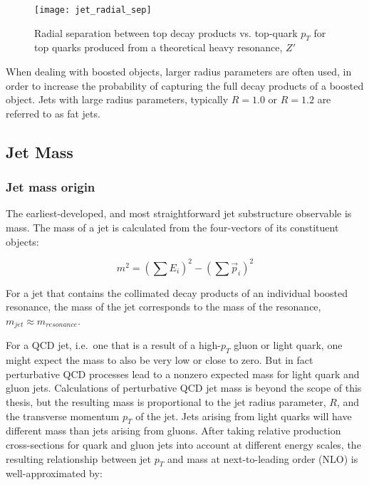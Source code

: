 \begin{figure}[!ht]
    \centering
\texttt{[image: jet\_radial\_sep]}
\caption{Radial separation between top decay products vs. top-quark $p_T$ for top quarks produced from a theoretical heavy resonance, $Z'$}
\label{fig:jet_radial_sep}
\end{figure}

When dealing with boosted objects, larger radius parameters are often used, in order to increase the probability
of capturing the full decay products of a boosted object.
Jets with large radius parameters, typically $R=1.0$ or $R=1.2$ are referred to as fat jets.

\subsection{Jet Mass}\label{subsec:jet_mass}

\subsubsection{Jet mass origin}

The earliest-developed, and most straightforward jet substructure observable is mass.
The mass of a jet is calculated from the four-vectors of its constituent objects:

\begin{equation}\label{eq:jet_mass}
    m^2 = \left(\sum E_i\right)^2 - \left(\sum \vec{p}_i \right)^2
\end{equation}

For a jet that contains the collimated decay products of an individual boosted resonance,
the mass of the jet corresponds to the mass of the resonance, $m_{jet} \approx m_{resonance}$.

For a QCD jet, i.e.\ one that is a result of a high-$p_T$ gluon or light quark, one might expect the mass to also be very low or close to zero.
But in fact perturbative QCD processes lead to a nonzero expected mass for light quark and gluon jets.
Calculations of perturbative QCD jet mass is beyond the scope of this thesis,
but the resulting mass is proportional to the jet radius parameter, $R$, and the transverse momentum $p_T$ of the jet.
Jets arising from light quarks will have different mass than jets arising from gluons.
After taking relative production cross-sections for quark and gluon jets into account at different energy scales,
the resulting relationship between jet $p_T$ and mass at next-to-leading order (NLO) is well-approximated by:

